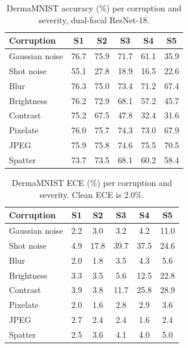 \documentclass[a4paper,11pt,en,citestyle=authoryear,bibstyle=authoryear]{elegantpaper}
\begin{document}
\begin{table}[H]
  \centering
  \caption{DermaMNIST accuracy (\%) per corruption and severity, dual-focal ResNet-18.}
  \label{tab:derma-acc}
  \begin{tabular}{lccccc}
    \toprule
    Corruption & S1 & S2 & S3 & S4 & S5 \\
    \midrule
    Gaussian noise & 76.7 & 75.9 & 71.7 & 61.1 & 35.9 \\
    Shot noise & 55.1 & 27.8 & 18.9 & 16.5 & 22.6 \\
    Blur & 76.3 & 75.0 & 73.4 & 71.2 & 67.4 \\
    Brightness & 76.2 & 72.9 & 68.1 & 57.2 & 45.7 \\
    Contrast & 75.2 & 67.5 & 47.8 & 32.4 & 31.6 \\
    Pixelate & 76.0 & 75.7 & 74.3 & 73.0 & 67.9 \\
    JPEG & 75.9 & 75.8 & 74.6 & 75.5 & 70.5 \\
    Spatter & 73.7 & 73.5 & 68.1 & 60.2 & 58.4 \\
    \bottomrule
  \end{tabular}
\end{table}

\begin{table}[H]
  \centering
  \caption{DermaMNIST ECE (\%) per corruption and severity. Clean ECE is 2.0\%.}
  \label{tab:derma-ece}
  \begin{tabular}{lccccc}
    \toprule
    Corruption & S1 & S2 & S3 & S4 & S5 \\
    \midrule
    Gaussian noise & 2.2 & 3.0 & 3.2 & 4.2 & 11.0 \\
    Shot noise & 4.9 & 17.8 & 39.7 & 37.5 & 24.6 \\
    Blur & 2.0 & 1.8 & 3.5 & 4.3 & 5.6 \\
    Brightness & 3.3 & 3.5 & 5.6 & 12.5 & 22.8 \\
    Contrast & 3.9 & 3.8 & 11.7 & 25.8 & 28.9 \\
    Pixelate & 2.0 & 1.6 & 2.8 & 2.9 & 3.6 \\
    JPEG & 2.7 & 2.4 & 2.4 & 1.6 & 2.4 \\
    Spatter & 2.5 & 3.6 & 4.1 & 4.0 & 5.0 \\
    \bottomrule
  \end{tabular}
\end{table}
\end{document}
